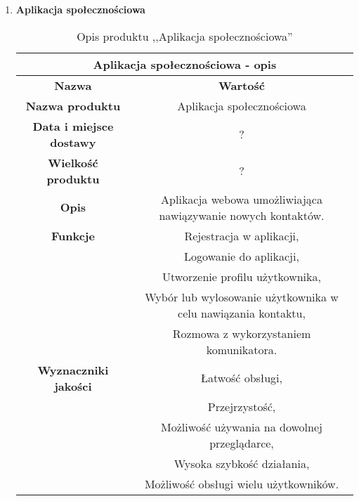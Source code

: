 \documentclass[12pt,a4paper]{article}
\begin{document}
\begin{enumerate}
    \item \textbf{Aplikacja społecznościowa}
    \begin{table}[htb]
    \centering
      \begin{tabular}{|c|c|}
      \hline
      \multicolumn{2}{|c|}{Aplikacja społecznościowa - opis} \\
      \hline
      {\bf Nazwa} & {\bf Wartość} \\
      \hline
      \textbf{Nazwa produktu} & Aplikacja społecznościowa \\
      \hline
      \textbf{Data i miejsce dostawy} & ? \\
      \hline
      \textbf{Wielkość produktu} & ? \\
      \hline
      \textbf{Opis} & Aplikacja webowa umożliwiająca nawiązywanie nowych kontaktów.  \\
      \hline
      \textbf{Funkcje} 
                      & Rejestracja w aplikacji, \\
                      & Logowanie do aplikacji, \\
                      & Utworzenie profilu użytkownika, \\
                      & Wybór lub wylosowanie użytkownika w celu nawiązania kontaktu, \\
                      & Rozmowa z wykorzystaniem komunikatora. \\
      
      \hline
      \textbf{Wyznaczniki jakości} 
                      & Łatwość obsługi, \\
                      & Przejrzystość, \\
                      & Możliwość używania na dowolnej przeglądarce, \\
                      & Wysoka szybkość działania, \\
                      & Możliwość obsługi wielu użytkowników. \\
      
      \hline
      \end{tabular}
    \caption{Opis produktu ,,Aplikacja społecznościowa''}
    \label{tab:produkt1}
    \end{table}
    

\end{enumerate}
\end{document}
